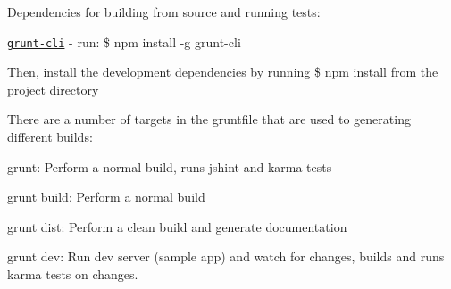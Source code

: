 Dependencies for building from source and running tests\+:


\begin{DoxyItemize}
\item \href{https://github.com/gruntjs/grunt-cli}{\tt grunt-\/cli} -\/ run\+: {\ttfamily \$ npm install -\/g grunt-\/cli}
\item Then, install the development dependencies by running {\ttfamily \$ npm install} from the project directory
\end{DoxyItemize}

There are a number of targets in the gruntfile that are used to generating different builds\+:


\begin{DoxyItemize}
\item {\ttfamily grunt}\+: Perform a normal build, runs jshint and karma tests
\item {\ttfamily grunt build}\+: Perform a normal build
\item {\ttfamily grunt dist}\+: Perform a clean build and generate documentation
\item {\ttfamily grunt dev}\+: Run dev server (sample app) and watch for changes, builds and runs karma tests on changes. 
\end{DoxyItemize}